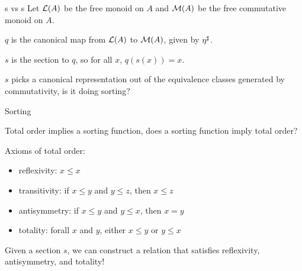 \documentclass[9pt]{beamer}
\begin{document}
\begin{frame}{s vs s}
Let $\mathcal{L}(A)$ be the \alert{free monoid} on $A$ and $\mathcal{M}(A)$ be the \alert{free commutative monoid} on $A$.



$q$ is the \alert{canonical map} from $\mathcal{L}(A)$ to $\mathcal{M}(A)$, given by ${\eta}^{\sharp}$.

$s$ is the \alert{section} to $q$, so for all $x$, $q(s(x)) = x$.

$s$ picks a canonical representation out of the equivalence classes generated by commutativity,
is it doing sorting?
    
\end{frame}

\begin{frame}{Sorting}

\begin{qblock}
Total order implies a sorting function, does a sorting function imply total order?
\end{qblock}

Axioms of \alert{total order}:
\begin{itemize}
    \item reflexivity: $x \leq x$
    \item transitivity: if $x \leq y$ and $y \leq z$, then $x \leq z$
    \item antisymmetry: if $x \leq y$ and $y \leq x$, then $x = y$
    \item totality: forall $x$ and $y$, either $x \leq y$ or $y \leq x$ 
\end{itemize}

Given a section $s$, we can construct a relation that satisfies \alert{reflexivity}, \alert{antisymmetry}, and \alert{totality}!

\end{frame}
\end{document}
